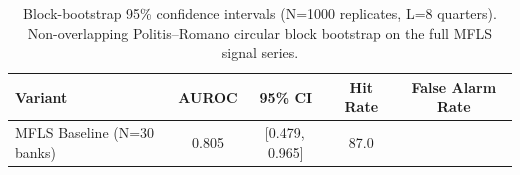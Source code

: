\begin{table}[h]
\centering
\caption{Block-bootstrap 95\% confidence intervals (N=1000 replicates, L=8 quarters). Non-overlapping Politis--Romano circular block bootstrap on the full MFLS signal series.}
\label{tab:bootstrap_ci}
\begin{tabular}{lcccc}
\toprule
Variant & AUROC & 95\% CI & Hit Rate & False Alarm Rate \\
\midrule
MFLS Baseline (N=30 banks) & 0.805 & [0.479,\,0.965] & 87.0%
\bottomrule
\end{tabular}
\end{table}